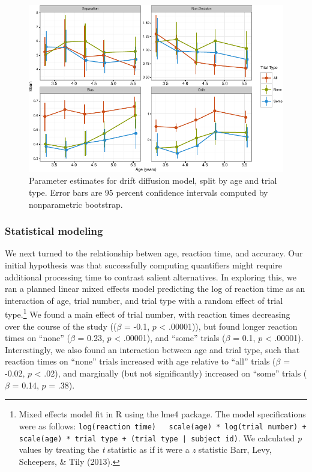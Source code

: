 \documentclass[10pt, letterpaper]{article}
\newenvironment{CodeChunk}{}{}
\begin{document}
\begin{CodeChunk}
\begin{figure}[t]

{\centering \includegraphics{figs/param_plot-1} 

}

\caption[Parameter estimates for drift diffusion model, split by age and trial type]{Parameter estimates for drift diffusion model, split by age and trial type. Error bars are 95 percent confidence intervals computed by nonparametric bootstrap.}\label{fig:param_plot}
\end{figure}
\end{CodeChunk}

\subsubsection{Statistical modeling}\label{statistical-modeling-1}

We next turned to the relationship betwen age, reaction time, and
accuracy. Our initial hypothesis was that successfully computing
quantifiers might require additional processing time to contrast salient
alternatives. In exploring this, we ran a planned linear mixed effects
model predicting the log of reaction time as an interaction of age,
trial number, and trial type with a random effect of trial
type.\footnote{Mixed effects model fit in R using the lme4 package. The
  model specifications were as follows:
  \texttt{log(reaction time) ~ scale(age) * log(trial number) + scale(age) * trial type + (trial type | subject id)}.
  We calculated \emph{p} values by treating the \emph{t} statistic as if
  it were a \emph{z} statistic Barr, Levy, Scheepers, \& Tily (2013).}
We found a main effect of trial number, with reaction times decreasing
over the course of the study ((\(\beta\) = -0.1, \(p\) \textless{}
.00001)), but found longer reaction times on ``none'' (\(\beta\) = 0.23,
\(p\) \textless{} .00001), and ``some'' trials (\(\beta\) = 0.1, \(p\)
\textless{} .00001). Interestingly, we also found an interaction between
age and trial type, such that reaction times on ``none'' trials
increased with age relative to ``all'' trials (\(\beta\) = -0.02, \(p\)
\textless{} .02), and marginally (but not significantly) increased on
``some'' trials (\(\beta\) = 0.14, \(p\) = .38).
\end{document}
